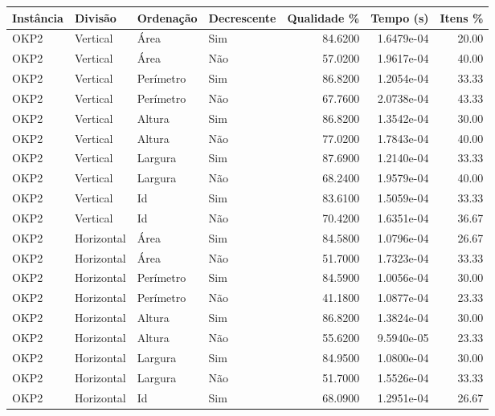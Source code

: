 \begin{tabular}{llllrrr}
\hline
Instância & Divisão     & Ordenação & Decrescente & Qualidade \% & Tempo (s)  & Itens \% \\
\hline
OKP2      & Vertical    & Área      & Sim         & 84.6200      & 1.6479e-04 & 20.00    \\
OKP2      & Vertical    & Área      & Não         & 57.0200      & 1.9617e-04 & 40.00    \\
OKP2      & Vertical    & Perímetro & Sim         & 86.8200      & 1.2054e-04 & 33.33    \\
OKP2      & Vertical    & Perímetro & Não         & 67.7600      & 2.0738e-04 & 43.33    \\
OKP2      & Vertical    & Altura    & Sim         & 86.8200      & 1.3542e-04 & 30.00    \\
OKP2      & Vertical    & Altura    & Não         & 77.0200      & 1.7843e-04 & 40.00    \\
OKP2      & Vertical    & Largura   & Sim         & 87.6900      & 1.2140e-04 & 33.33    \\
OKP2      & Vertical    & Largura   & Não         & 68.2400      & 1.9579e-04 & 40.00    \\
OKP2      & Vertical    & Id        & Sim         & 83.6100      & 1.5059e-04 & 33.33    \\
OKP2      & Vertical    & Id        & Não         & 70.4200      & 1.6351e-04 & 36.67    \\
OKP2      & Horizontal  & Área      & Sim         & 84.5800      & 1.0796e-04 & 26.67    \\
OKP2      & Horizontal  & Área      & Não         & 51.7000      & 1.7323e-04 & 33.33    \\
OKP2      & Horizontal  & Perímetro & Sim         & 84.5900      & 1.0056e-04 & 30.00    \\
OKP2      & Horizontal  & Perímetro & Não         & 41.1800      & 1.0877e-04 & 23.33    \\
OKP2      & Horizontal  & Altura    & Sim         & 86.8200      & 1.3824e-04 & 30.00    \\
OKP2      & Horizontal  & Altura    & Não         & 55.6200      & 9.5940e-05 & 23.33    \\
OKP2      & Horizontal  & Largura   & Sim         & 84.9500      & 1.0800e-04 & 30.00    \\
OKP2      & Horizontal  & Largura   & Não         & 51.7000      & 1.5526e-04 & 33.33    \\
OKP2      & Horizontal  & Id        & Sim         & 68.0900      & 1.2951e-04 & 26.67    \\

\end{tabular}
